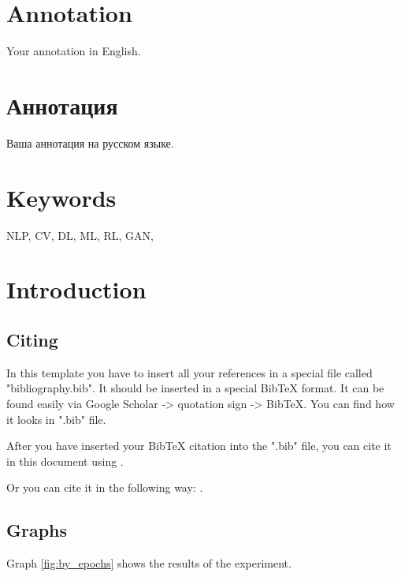 \documentclass[a4paper,14pt]{extarticle}
\begin{document}
\newpage

{
	\hypersetup{linkcolor=black}
	\tableofcontents
}

\newpage
\section*{Annotation}

Your annotation in English.

\section*{\foreignlanguage{russian}{Аннотация}} %
\foreignlanguage{russian}{
	Ваша аннотация на русском языке.
}

\section*{Keywords}
NLP, CV, DL, ML, RL, GAN,
\pagebreak

\section{Introduction}

\subsection{Citing}

In this template you have to insert all your references in a special file
called "bibliography.bib". It should be inserted in a special BibTeX format.
It can be found easily via Google Scholar -> quotation sign -> BibTeX. You can find how it looks in ".bib" file.

After you have inserted your BibTeX citation into the ".bib" file, you can cite it in this document using \cite{vaswani2017}.

Or you can cite it in the following way: \cite{kim2020code}.

\subsection{Graphs}

Graph \ref{fig:by_epochs} shows the results of the experiment.
\end{document}
